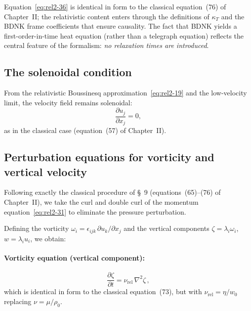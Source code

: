 Equation~\eqref{eq:rel2-36} is identical in form to the classical
equation~(76) of Chapter~II; the relativistic content enters through the
definitions of $\kappa_T$ and the BDNK frame coefficients that ensure
causality.  The fact that BDNK yields a first-order-in-time heat equation
(rather than a telegraph equation) reflects the central feature of the
formalism: \emph{no relaxation times are introduced}.

\subsection{The solenoidal condition}\label{sec:rel9e}

From the relativistic Boussinesq approximation~\eqref{eq:rel2-19}
and the low-velocity limit, the velocity field remains solenoidal:
\begin{equation}
\label{eq:rel2-38}
  \frac{\partial u_j}{\partial x_j} = 0,
\end{equation}
as in the classical case (equation~(57) of Chapter~II).

\subsection{Perturbation equations for vorticity and vertical velocity}%
\label{sec:rel9f}

Following exactly the classical procedure of \S~9 (equations~(65)--(76) of
Chapter~II), we take the curl and double curl of the momentum
equation~\eqref{eq:rel2-31} to eliminate the pressure perturbation.

Defining the vorticity $\omega_i = \epsilon_{ijk}\,\partial u_k/\partial x_j$
and the vertical components $\zeta = \lambda_i\omega_i$,
$w = \lambda_i u_i$, we obtain:

\paragraph{Vorticity equation (vertical component):}
\begin{equation}
\label{eq:rel2-39}
  \frac{\partial\zeta}{\partial t} = \nu_{\mathrm{rel}}\,\nabla^2\zeta\,,
\end{equation}
which is identical in form to the classical equation~(73), but with
$\nu_{\mathrm{rel}} = \eta/w_0$ replacing $\nu = \mu/\rho_0$.


